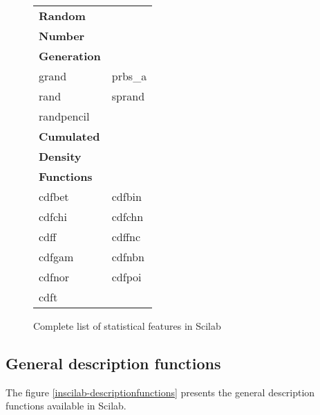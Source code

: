 \begin{figure}[htbp]
\begin{tabular}{|l|l|}
\textbf{Random} &\\
\textbf{Number} &\\
\textbf{Generation} &\\
\hline
grand & prbs\_a \\
rand & sprand \\
randpencil &\\
\hline
\hline
\textbf{Cumulated} &\\
\textbf{Density} &\\
\textbf{Functions} &\\
\hline
cdfbet & cdfbin  \\
cdfchi & cdfchn  \\
cdff & cdffnc  \\
cdfgam & cdfnbn  \\
cdfnor & cdfpoi  \\
cdft & \\
\hline
\end{tabular}
\caption{Complete list of statistical features in Scilab}
\label{inscilab-fulllist}
\end{figure}

\subsection{General description functions}

The figure \ref{inscilab-descriptionfunctions} presents the 
general description functions available in Scilab.

